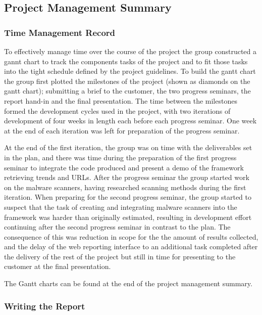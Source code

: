 \subsection{Project Management Summary}

\subsubsection{Time Management Record}

To effectively manage time over the course of the project the group constructed
a gannt chart to track the components tasks of the project and to fit those tasks into the
tight schedule defined by the project guidelines. To build the gantt chart the
group first plotted the milestones of the project (shown as diamonds on the
gantt chart); submitting a brief to the
customer, the two progress seminars, the report hand-in and the final
presentation. The time between the milestones formed the development cycles
used in the project, with two iterations of development of four weeks in length
each before each progress seminar. One week at the end of each iteration was
left for preparation of the progress seminar.

At the end of the first iteration, the group was on time with the deliverables
set in the plan, and there was time during the preparation of the first progress
seminar to integrate the code produced and present a demo of the framework
retrieving trends and URLs. After the progress seminar the group started work on
the malware scanners, having researched scanning methods during the first
iteration. When preparing for the second progress seminar, the group started to
suspect that the task of creating and integrating malware scanners into the
framework was harder than originally estimated, resulting in development effort
continuing after the second progress seminar in contrast to the plan. The
consequence of this was reduction in scope for the the amount of results
collected, and the delay of the web reporting interface to an additional task
completed after the delivery of the rest of the project but still in time for
presenting to the customer at the final presentation.

The Gantt charts can be found at the end of the project management summary.

\subsubsection{Writing the Report}


